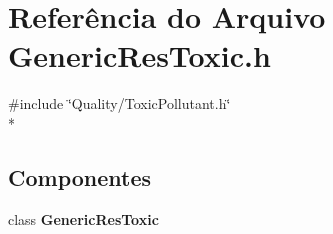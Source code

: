 \section{Referência do Arquivo Generic\+Res\+Toxic.\+h}
\label{_generic_res_toxic_8h}
{\ttfamily \#include \char`\"{}Quality/\+Toxic\+Pollutant.\+h\char`\"{}}\\*
\subsection*{Componentes}
\begin{DoxyCompactItemize}
\item 
class {\bf Generic\+Res\+Toxic}
\end{DoxyCompactItemize}
